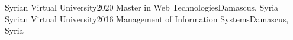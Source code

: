 \resumeSubheading
    {Syrian Virtual University}{2020}
    {Master in Web Technologies}{Damascus, Syria}
\resumeSubheading
    {Syrian Virtual University}{2016}
    {Management of Information Systems}{Damascus, Syria}